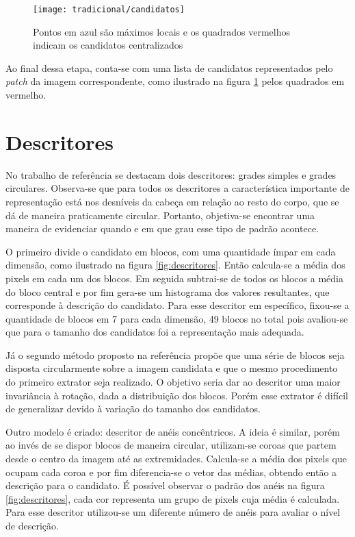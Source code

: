 \begin{figure}[h]
\caption{Pontos em azul são máximos locais e os quadrados vermelhos indicam os candidatos centralizados}
\centering
\texttt{[image: tradicional/candidatos]}
\label{fig:candidatos}
\end{figure}

Ao final dessa etapa, conta-se com uma lista de candidatos representados pelo \textit{patch} da imagem correspondente, como ilustrado na figura \ref{fig:candidatos} pelos quadrados em vermelho.

\section{Descritores}
No trabalho de referência se destacam dois descritores: grades simples e grades circulares. Observa-se que para todos os descritores a característica importante de representação está nos desníveis da cabeça em relação ao resto do corpo, que se dá de maneira praticamente circular. Portanto, objetiva-se encontrar uma maneira de evidenciar quando e em que grau esse tipo de padrão acontece.

O primeiro divide o candidato em blocos, com uma quantidade ímpar em cada dimensão, como ilustrado na figura \ref{fig:descritores}. Então calcula-se a média dos pixels em cada um dos blocos. Em seguida subtrai-se de todos os blocos a média do bloco central e por fim gera-se um histograma dos valores resultantes, que corresponde à descrição do candidato. Para esse descritor em específico, fixou-se a quantidade de blocos em 7 para cada dimensão, 49 blocos no total pois avaliou-se que para o tamanho dos candidatos foi a representação mais adequada.

Já o segundo método proposto na referência propõe que uma série de blocos seja disposta circularmente sobre a imagem candidata e que o mesmo procedimento do primeiro extrator seja realizado. O objetivo seria dar ao descritor uma maior invariância à rotação, dada a distribuição dos blocos. Porém esse extrator é difícil de generalizar devido à variação do tamanho dos candidatos.

Outro modelo é criado: descritor de anéis concêntricos. A ideia é similar, porém ao invés de se dispor blocos de maneira circular, utilizam-se coroas que partem desde o centro da imagem até as extremidades. Calcula-se a média dos pixels que ocupam cada coroa e por fim diferencia-se o vetor das médias, obtendo então a descrição para o candidato. É possível observar o padrão dos anéis na figura \ref{fig:descritores}, cada cor representa um grupo de pixels cuja média é calculada. Para esse descritor utilizou-se um diferente número de anéis para avaliar o nível de descrição.

